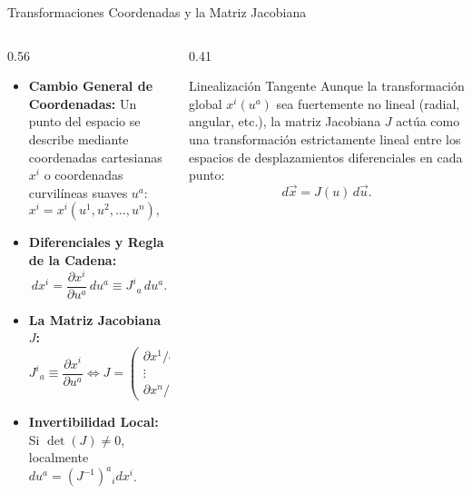 \documentclass[10pt,aspectratio=169]{beamer}
\begin{document}
\begin{frame}{Transformaciones Coordenadas y la Matriz Jacobiana}
  \begin{columns}[c]
    \begin{column}{0.56\textwidth}
      \footnotesize
      \begin{itemize}\itemsep2pt
        \item \textbf{Cambio General de Coordenadas:}
        Un punto del espacio se describe mediante coordenadas cartesianas $x^i$ o coordenadas curvilíneas suaves $u^a$:
        \[
        x^i = x^i(u^1, u^2, \dots, u^n), \quad i, a \in \{1, \dots, n\}.
        \]
        \item \textbf{Diferenciales y Regla de la Cadena:}
        \[
        dx^i = \frac{\partial x^i}{\partial u^a}\, du^a \equiv J^i{}_a\, du^a.
        \]
        \item \textbf{La Matriz Jacobiana $J$:}
        \[
        \boxed{J^i{}_a \equiv \frac{\partial x^i}{\partial u^a}} \iff J = \begin{pmatrix} \partial x^1/\partial u^1 & \cdots & \partial x^1/\partial u^n \\ \vdots & \ddots & \vdots \\ \partial x^n/\partial u^1 & \cdots & \partial x^n/\partial u^n \end{pmatrix}.
        \]
        \item \textbf{Invertibilidad Local:}
        Si $\det(J) \neq 0$, localmente $du^a = (J^{-1})^a{}_i dx^i$.
      \end{itemize}
    \end{column}
    \begin{column}{0.41\textwidth}
      \footnotesize
      \begin{block}{Linealización Tangente}
        \scriptsize
        Aunque la transformación global $x^i(u^a)$ sea fuertemente no lineal (radial, angular, etc.), la matriz Jacobiana $J$ actúa como una transformación estrictamente lineal entre los espacios de desplazamientos diferenciales en cada punto:
        \[
        d\vec{x} = J(u)\, d\vec{u}.
        \]
      \end{block}
    \end{column}
  \end{columns}
\end{frame}
\end{document}
